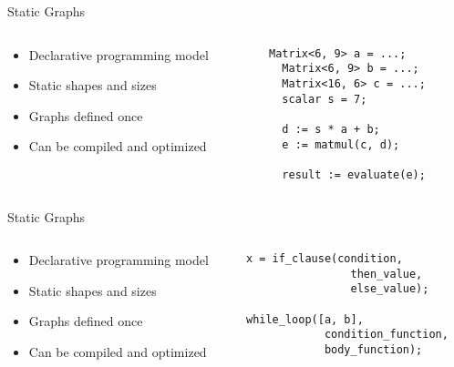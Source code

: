 \begin{frame}[fragile]{Static Graphs}
  \begin{columns}
    \begin{column}{0.55\textwidth}
      \begin{itemize}
        \item Declarative programming model
        \item Static shapes and sizes
        \item Graphs defined once
        \item Can be compiled and optimized
      \end{itemize}
    \end{column}
    \begin{column}{0.45\textwidth}
      \begin{lstlisting}[language=pseudoML]
  Matrix<6, 9> a = ...;
  Matrix<6, 9> b = ...;
  Matrix<16, 6> c = ...;
  scalar s = 7;

  d := s * a + b;
  e := matmul(c, d);

  result := evaluate(e);
      \end{lstlisting}
    \end{column}
  \end{columns}
\end{frame}

\begin{frame}[fragile]{Static Graphs}
  \begin{columns}
    \begin{column}{0.55\textwidth}
      \begin{itemize}
        \item Declarative programming model
        \item Static shapes and sizes
        \item Graphs defined once
        \item Can be compiled and optimized
      \end{itemize}
    \end{column}
    \begin{column}{0.45\textwidth}
      \begin{lstlisting}[language=pseudoML]
x = if_clause(condition,
                then_value,
                else_value);

while_loop([a, b],
            condition_function,
            body_function);
      \end{lstlisting}
    \end{column}
  \end{columns}
\end{frame}


